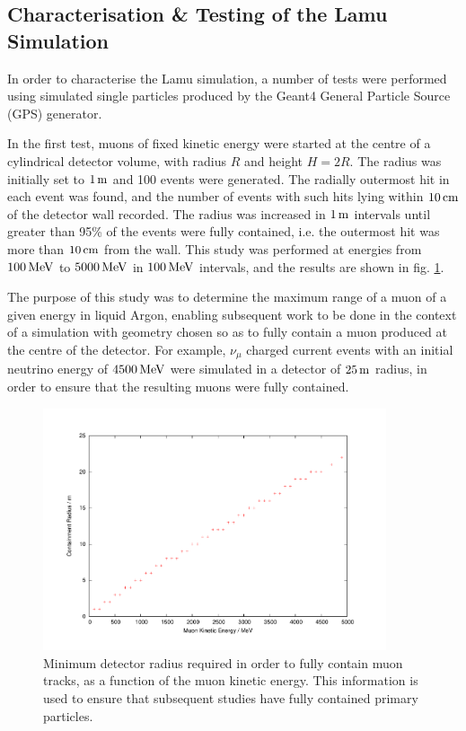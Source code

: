 \subsection{Characterisation \& Testing of the Lamu Simulation}
In order to characterise the Lamu simulation, a number of tests were performed using simulated single particles produced by the Geant4 General Particle Source (GPS) generator\citep{GeantGPS}.

In the first test, muons of fixed kinetic energy were started at the centre of a cylindrical detector volume, with radius $R$ and height $H=2R$. The radius was initially set to $1\metre$ and 100 events were generated. The radially outermost hit in each event was found, and the number of events with such hits lying within $10\cm$ of the detector wall recorded. The radius was increased in $1\metre$ intervals until greater than 95\% of the events were fully contained, i.e. the outermost hit was more than $10\cm$ from the wall. This study was performed at energies from $100\MeV$ to $5000\MeV$ in $100\MeV$ intervals, and the results are shown in fig. \ref{fig:lamu-containment-radius}.

The purpose of this study was to determine the maximum range of a muon of a given energy in liquid Argon, enabling subsequent work to be done in the context of a simulation with geometry chosen so as to fully contain a muon produced at the centre of the detector. For example, $\nu_\mu$ charged current events with an initial neutrino energy of $4500\MeV$ were simulated in a detector of $25\metre$ radius, in order to ensure that the resulting muons were fully contained.

\begin{figure}
\centering
\includegraphics[angle=-90,width=0.9\textwidth]{chapters/detectorphysics_images/containment_radius}
\caption[Detector radius required for full containment as a function of energy]{\label{fig:lamu-containment-radius}Minimum detector radius required in order to fully contain muon tracks, as a function of the muon kinetic energy. This information is used to ensure that subsequent studies have fully contained primary particles.}
\end{figure}

